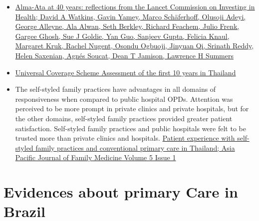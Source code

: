 \documentclass[]{book}
\begin{document}
\begin{itemize}
\item
  \href{https://sci-hub.se/https://doi.org/10.1016/S0140-6736(18)32389-4}{Alma-Ata at 40 years: reflections from the Lancet Commission on Investing in Health; David A Watkins, Gavin Yamey, Marco Schäferhoff, Olusoji Adeyi, George Alleyne, Ala Alwan, Seth Berkley, Richard Feachem, Julio Frenk, Gargee Ghosh, Sue J Goldie, Yan Guo, Sanjeev Gupta, Felicia Knaul, Margaret Kruk, Rachel Nugent, Osondu Ogbuoji, Jinyuan Qi, Srinath Reddy, Helen Saxenian, Agnés Soucat, Dean T Jamison, Lawrence H Summers}
\item
  \href{https://www.hsri.or.th/sites/default/files/browse/tor5-1-1.pdf}{Universal Coverage Scheme Assessment of the first 10 years in Thailand}
\item
  The self-styled family practices have advantages in all domains of responsiveness when compared to public hospital OPDs. Attention was perceived to be more prompt in private clinics and private hospitals, but for the other domains, self-styled family practices provided greater patient satisfaction. Self-styled family practices and public hospitals were felt to be trusted more than private clinics and hospitals. \href{http://www.apfmj-archive.com/afm5_1/afm27.pdf}{Patient experience with self-styled family practices and conventional primary care in Thailand; Asia Pacific Journal of Family Medicine Volume 5 Issue 1}
\end{itemize}

\hypertarget{evidences-about-primary-care-in-brazil}{%
\section*{Evidences about primary Care in Brazil}\label{evidences-about-primary-care-in-brazil}}
\end{document}
